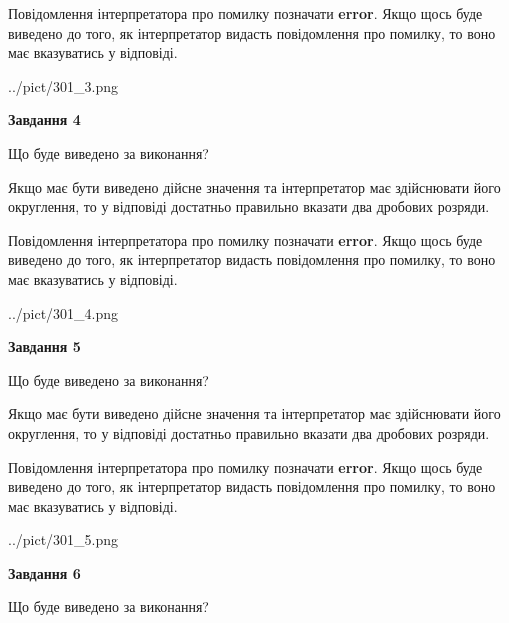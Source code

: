 \documentclass[12pt, ukrainian]{article}
\begin{document}
{\begin {Large}
Повідомлення інтерпретатора про помилку позначати \textbf{error}.
Якщо щось буде виведено до того, як інтерпретатор видасть повідомлення про помилку, 
то воно має вказуватись у відповіді. \par

\begin{center}
	{../pict/301_3.png}
\end{center}
\newpage

{\begin {center}\textbf{Завдання 4}\end {center}}\par
Що буде виведено за виконання? \par

Якщо має бути виведено дійсне значення та інтерпретатор має здійснювати його округлення, 
то у відповіді достатньо правильно вказати два дробових розряди.

Повідомлення інтерпретатора про помилку позначати \textbf{error}.
Якщо щось буде виведено до того, як інтерпретатор видасть повідомлення про помилку, 
то воно має вказуватись у відповіді. \par

\begin{center}
	{../pict/301_4.png}
\end{center}
\newpage

{\begin {center}\textbf{Завдання 5}\end {center}}\par
Що буде виведено за виконання? \par

Якщо має бути виведено дійсне значення та інтерпретатор має здійснювати його округлення, 
то у відповіді достатньо правильно вказати два дробових розряди.

Повідомлення інтерпретатора про помилку позначати \textbf{error}.
Якщо щось буде виведено до того, як інтерпретатор видасть повідомлення про помилку, 
то воно має вказуватись у відповіді. \par

\begin{center}
	{../pict/301_5.png}
\end{center}
\newpage

{\begin {center}\textbf{Завдання 6}\end {center}}\par
Що буде виведено за виконання? \par


\end{Large}}
\end{document}
